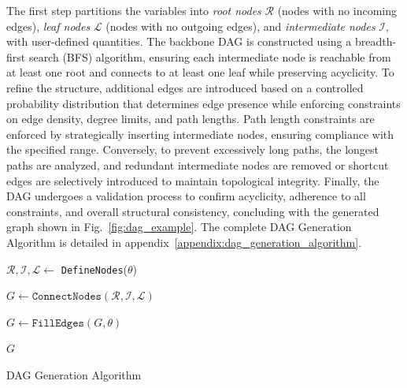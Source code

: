 \documentclass{article}
\begin{document}
            The first step partitions the variables into \emph{root nodes} $ \mathcal{R} $ (nodes with no incoming edges), \emph{leaf nodes} $ \mathcal{L} $ (nodes with no outgoing edges), and \emph{intermediate nodes} $ \mathcal{I} $, with user-defined quantities. 
            The backbone DAG is constructed using a breadth-first search (BFS) algorithm, ensuring each intermediate node is reachable from at least one root and connects to at least one leaf while preserving acyclicity. 
            To refine the structure, additional edges are introduced based on a controlled probability distribution that determines edge presence while enforcing constraints on edge density, degree limits, and path lengths. 
            Path length constraints are enforced by strategically inserting intermediate nodes, ensuring compliance with the specified range. 
            Conversely, to prevent excessively long paths, the longest paths are analyzed, and redundant intermediate nodes are removed or shortcut edges are selectively introduced to maintain topological integrity. 
            Finally, the DAG undergoes a validation process to confirm acyclicity, adherence to all constraints, and overall structural consistency, concluding with the generated graph shown in Fig.~\ref{fig:dag_example}.
            The complete DAG Generation Algorithm is detailed in appendix~\ref{appendix:dag_generation_algorithm}.
            \begin{algorithm}
                \DontPrintSemicolon
            
                $\mathcal{R}, \mathcal{I}, \mathcal{L} \leftarrow$ \texttt{DefineNodes}($\theta$) 
            
                $G \leftarrow \texttt{ConnectNodes}(\mathcal{R}, \mathcal{I}, \mathcal{L})$ 
            
                $G \leftarrow \texttt{FillEdges}(G, \theta)$
            
                \Return $G$
                \caption{DAG Generation Algorithm}
            \end{algorithm}
            
\end{document}
